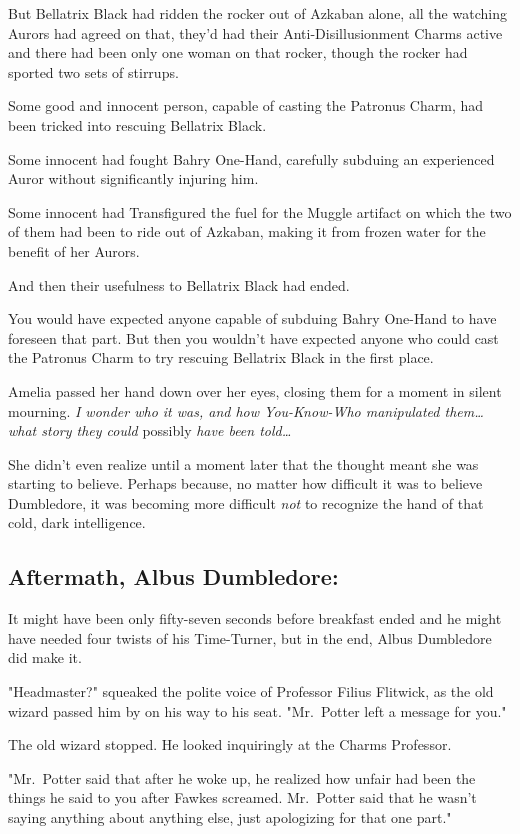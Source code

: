 But Bellatrix Black had ridden the rocker out of Azkaban alone, all the 
watching Aurors had agreed on that, they'd had their Anti-Disillusionment 
Charms active and there had been only one woman on that rocker, though the 
rocker had sported two sets of stirrups.

Some good and innocent person, capable of casting the Patronus Charm, had been 
tricked into rescuing Bellatrix Black.

Some innocent had fought Bahry One-Hand, carefully subduing an experienced 
Auror without significantly injuring him.

Some innocent had Transfigured the fuel for the Muggle artifact on which the 
two of them had been to ride out of Azkaban, making it from frozen water for 
the benefit of her Aurors.

And then their usefulness to Bellatrix Black had ended.

You would have expected anyone capable of subduing Bahry One-Hand to have 
foreseen that part. But then you wouldn't have expected anyone who could cast 
the Patronus Charm to try rescuing Bellatrix Black in the first place.

Amelia passed her hand down over her eyes, closing them for a moment in silent 
mourning. \emph{I wonder who it was, and how You-Know-Who manipulated 
them{\ldots} what story they could} possibly \emph{have been told{\ldots}}

She didn't even realize until a moment later that the thought meant she was 
starting to believe. Perhaps because, no matter how difficult it was to believe 
Dumbledore, it was becoming more difficult \emph{not} to recognize the hand of 
that cold, dark intelligence.
\sbreak
\vspace{-2\baselineskip}
\subsection{Aftermath, Albus Dumbledore:}

It might have been only fifty-seven seconds before breakfast ended and he might 
have needed four twists of his Time-Turner, but in the end, Albus Dumbledore 
did make it.

"Headmaster?" squeaked the polite voice of Professor Filius Flitwick, as the 
old wizard passed him by on his way to his seat. "Mr.~Potter left a message for 
you."

The old wizard stopped. He looked inquiringly at the Charms Professor.

"Mr.~Potter said that after he woke up, he realized how unfair had been the 
things he said to you after Fawkes screamed. Mr.~Potter said that he wasn't 
saying anything about anything else, just apologizing for that one part."

